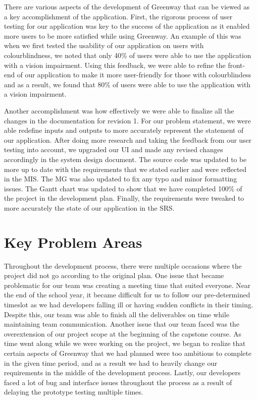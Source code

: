 \documentclass{article}
\begin{document}
There are various aspects of the development of Greenway that can be viewed as a key accomplishment of the application. First, the rigorous process of user testing for our application was key to the success of the application as it enabled more users to be more satisfied while using Greenway. An example of this was when we first tested the usability of our application on users with colourblindness, we noted that only 40\% of users were able to use the application with a vision impairment. Using this feedback, we were able to refine the front-end of our application to make it more user-friendly for those with colourblindess and as a result, we found that 80\% of users were able to use the application with a vision impairment. 

Another accomplishment was how effectively we were able to finalize all the changes in the documentation for revision 1. For our problem statement, we were able redefine inputs and outputs to more accurately represent the statement of our application. After doing more research and taking the feedback from our user testing into account, we upgraded our UI and made any revised changes accordingly in the system design document. The source code was updated to be more up to date with the requirements that we stated earlier and were reflected in the MIS. The MG was also updated to fix any typo and minor formatting issues. The Gantt chart was updated to show that we have completed 100\% of the project in the development plan. Finally, the requirements were tweaked to more accurately the state of our application in the SRS. 

\section{Key Problem Areas}

Throughout the development process, there were multiple occasions where the project did not go according to the original plan. One issue that became problematic for our team was creating a meeting time that suited everyone. Near the end of the school year, it became difficult for us to follow our pre-determined timeslot as we had developers falling ill or having sudden conflicts in their timing. Despite this, our team was able to finish all the deliverables on time while maintaining team communication. Another issue that our team faced was the overextension of our project scope at the beginning of the capstone course. As time went along while we were working on the project, we began to realize that certain aspects of Greenway that we had planned were too ambitious to complete in the given time period, and as a result we had to heavily change our requirements in the middle of the development process. Lastly, our developers faced a lot of bug and interface issues throughout the process as a result of delaying the prototype testing multiple times.
\end{document}
